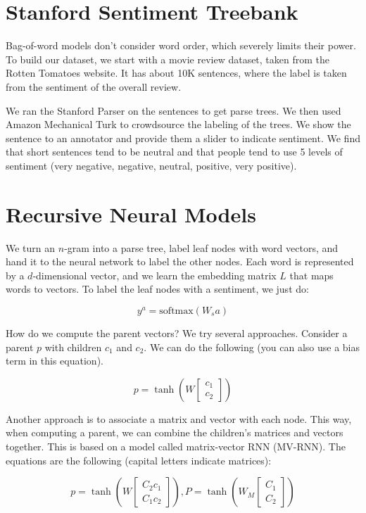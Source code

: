 \documentclass[a4paper]{article}
\begin{document}
\section{Stanford Sentiment Treebank}
Bag-of-word models don't consider word order, which severely limits their
power. To build our dataset, we start with a movie review dataset, taken from
the Rotten Tomatoes website. It has about 10K sentences, where the label is
taken from the sentiment of the overall review.

We ran the Stanford Parser on the sentences to get parse trees. We then
used Amazon Mechanical Turk to crowdsource the labeling of the trees. We show
the sentence to an annotator and provide them a slider to indicate sentiment.
We find that short sentences tend to be neutral and that people tend to use
5 levels of sentiment (very negative, negative, neutral, positive, very
positive).

\section{Recursive Neural Models}
We turn an $n$-gram into a parse tree, label leaf nodes with word vectors,
and hand it to the neural network to label the other nodes. Each word
is represented by a $d$-dimensional vector, and we learn the embedding matrix
$L$ that maps words to vectors. To label the leaf nodes with a sentiment,
we just do:

$$
y^a = \textrm{softmax}(W_s a)
$$

How do we compute the parent vectors? We try several approaches. Consider
a parent $p$ with children $c_1$ and $c_2$. We can do the following (you can
also use a bias term in this equation).

$$
p = \tanh(
  W
  \begin{bmatrix}
      c_1 \\
      c_2
  \end{bmatrix}
)
$$

Another approach is to associate a matrix and vector with each node. This way,
when computing a parent, we can combine the children's matrices and vectors
together. This is based on a model called matrix-vector RNN (MV-RNN).
The equations are the following (capital letters indicate matrices):

$$
p = \tanh(
W
\begin{bmatrix}
    C_2 c_1 \\
    C_1 c_2
\end{bmatrix}
),
P = \tanh(
W_M
\begin{bmatrix}
    C_1 \\
    C_2
\end{bmatrix}
)
$$
\end{document}
